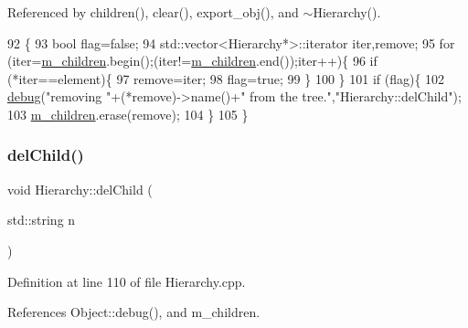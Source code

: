 Referenced by children(), clear(), export\+\_\+obj(), and $\sim$\+Hierarchy().


\begin{DoxyCode}
92                                           \{
93   \textcolor{keywordtype}{bool} flag=\textcolor{keyword}{false};
94   std::vector<Hierarchy*>::iterator iter,\textcolor{keyword}{remove};
95   \textcolor{keywordflow}{for} (iter=\hyperlink{classHierarchy_a038816763941fd4a930504917f60483b}{m\_children}.begin();(iter!=\hyperlink{classHierarchy_a038816763941fd4a930504917f60483b}{m\_children}.end());iter++)\{
96     \textcolor{keywordflow}{if} (*iter==element)\{
97       \textcolor{keyword}{remove}=iter;
98       flag=\textcolor{keyword}{true};
99     \}
100   \}
101   \textcolor{keywordflow}{if} (flag)\{
102     \hyperlink{classObject_aac010553f022165573714b7014a15f0d}{debug}(\textcolor{stringliteral}{"removing "}+(*remove)->name()+\textcolor{stringliteral}{" from the tree."},\textcolor{stringliteral}{"Hierarchy::delChild"});
103     \hyperlink{classHierarchy_a038816763941fd4a930504917f60483b}{m\_children}.erase(\textcolor{keyword}{remove});
104   \}
105 \}
\end{DoxyCode}
\mbox{\label{classHierarchy_a1928ac7615fe0b5e55cd707f70dc6781}} 
\subsubsection{\texorpdfstring{del\+Child()}{delChild()}\hspace{0.1cm}{\footnotesize\ttfamily [2/2]}}
{\footnotesize\ttfamily void Hierarchy\+::del\+Child (\begin{DoxyParamCaption}\item[{std\+::string}]{n }\end{DoxyParamCaption})}



Definition at line 110 of file Hierarchy.\+cpp.



References Object\+::debug(), and m\+\_\+children.


